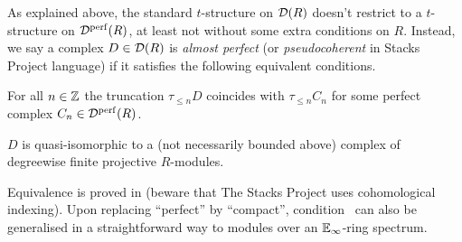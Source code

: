 \documentclass[a4paper, 10pt, oneside, DIV=9, chapterprefix=true, numbers=enddot,bibliography=totoc]{scrbook}
\begin{document}

\label{par:GTheory}
As explained above, the standard $t$-structure on $\mathcal{D}(R)$ doesn't restrict to a $t$-structure on $\mathcal{D}^{\mathrm{perf}}(R)$, at least not without some extra conditions on $R$. Instead, we say a complex $D\in \mathcal{D}(R)$ is \emph{almost perfect} (or \emph{pseudocoherent} in Stacks Project language) if it satisfies the following equivalent conditions.
\begin{alphanumerate}
	\item For all $n\in \mathbb{Z}$ the truncation $\tau_{\leq n}D$ coincides with $\tau_{\leq n}C_n$ for some perfect complex $C_n\in \mathcal{D}^{\mathrm{perf}}(R)$.
	\item $D$ is quasi-isomorphic to a (not necessarily bounded above) complex of degreewise finite projective $R$-modules.
\end{alphanumerate}
Equivalence is proved in \cite[]{stacks-project} (beware that The Stacks Project uses cohomological indexing). Upon replacing \enquote{perfect} by \enquote{compact}, condition~ can also be generalised in a straightforward way to modules over an $\mathbb{E}_\infty$-ring spectrum.
\end{document}
